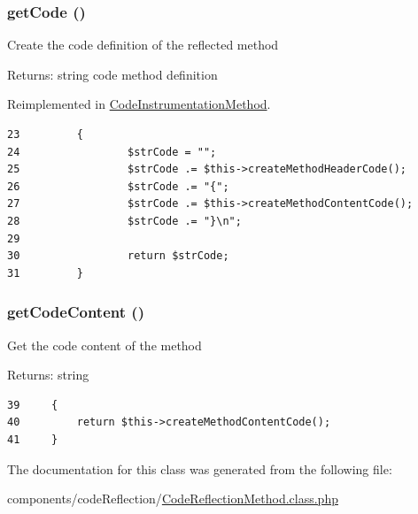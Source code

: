 \hypertarget{class_code_reflection_method_b5e24da53b4a0d0848b18c1e832f47ff}{
\subsubsection[{getCode}]{\setlength{\rightskip}{0pt plus 5cm}getCode ()}}
\label{class_code_reflection_method_b5e24da53b4a0d0848b18c1e832f47ff}


Create the code definition of the reflected method

\begin{Desc}
\item[Returns:]string code method definition \end{Desc}


Reimplemented in \hyperlink{class_code_instrumentation_method_b5e24da53b4a0d0848b18c1e832f47ff}{CodeInstrumentationMethod}.

\begin{Code}\begin{verbatim}23         {
24                 $strCode = "";
25                 $strCode .= $this->createMethodHeaderCode();
26                 $strCode .= "{";
27                 $strCode .= $this->createMethodContentCode();
28                 $strCode .= "}\n";
29 
30                 return $strCode;
31         }
\end{verbatim}
\end{Code}


\hypertarget{class_code_reflection_method_5796d91d5436d3d7e80b65f0913f1873}{
\subsubsection[{getCodeContent}]{\setlength{\rightskip}{0pt plus 5cm}getCodeContent ()}}
\label{class_code_reflection_method_5796d91d5436d3d7e80b65f0913f1873}


Get the code content of the method

\begin{Desc}
\item[Returns:]string \end{Desc}


\begin{Code}\begin{verbatim}39     {
40         return $this->createMethodContentCode();
41     }
\end{verbatim}
\end{Code}




The documentation for this class was generated from the following file:\begin{CompactItemize}
\item 
components/codeReflection/\hyperlink{_code_reflection_method_8class_8php}{CodeReflectionMethod.class.php}\end{CompactItemize}
